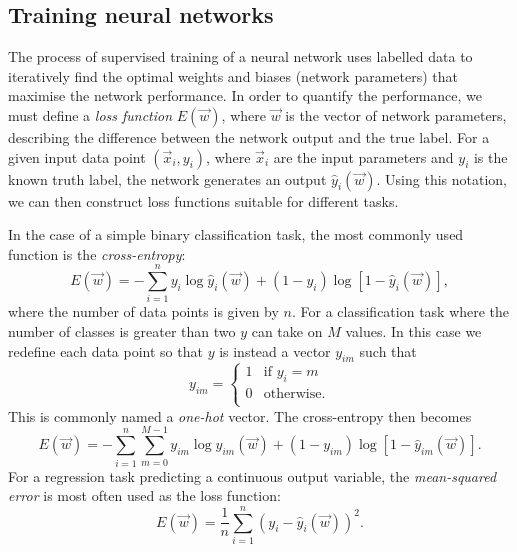 \subsection{Training neural networks} %
\label{sec:cvn_theory_training} %

The process of supervised training of a neural network uses labelled data to iteratively find the
optimal weights and biases (network parameters) that maximise the network performance. In order to
quantify the performance, we must define a \emph{loss function} $E(\vec{w})$, where $\vec{w}$ is
the vector of network parameters, describing the difference between the network output and the
true label. For a given input data point $(\vec{x}_{i}, y_{i})$, where $\vec{x}_{i}$ are the input
parameters and $y_{i}$ is the known truth label, the network generates an output
$\hat{y}_{i}(\vec{w})$. Using this notation, we can then construct loss functions suitable for
different tasks.

In the case of a simple binary classification task, the most commonly used function is the
\emph{cross-entropy}:
\begin{equation} %
    E(\vec{w})=
    -\displaystyle\sum_{i=1}^{n}y_{i}\log\hat{y}_{i}(\vec{w})+
    (1-y_{i})\log[1-\hat{y}_{i}(\vec{w})],
    \label{eq:binary_cross_entropy}
\end{equation}
where the number of data points is given by $n$. For a classification task where the number of
classes is greater than two $y$ can take on $M$ values. In this case we redefine each data point
so that $y$ is instead a vector $y_{im}$ such that
\begin{equation} %
    y_{im}=
    \begin{cases}
        1 & \text{if $y_{i}=m$} \\
        0 & \text{otherwise.}   \\
    \end{cases}
\end{equation}
This is commonly named a \emph{one-hot} vector. The cross-entropy then becomes
\begin{equation} %
    E(\vec{w})=
    -\displaystyle\sum_{i=1}^{n}\displaystyle\sum_{m=0}^{M-1}y_{im}\log\hat{y}_{im}
    (\vec{w})+(1-y_{im})\log[1-\hat{y}_{im}(\vec{w})].
    \label{eq:categorical_cross_entropy}
\end{equation}
For a regression task predicting a continuous output variable, the \emph{mean-squared error} is
most often used as the loss function:
\begin{equation} %
    E(\vec{w})=
    \frac{1}{n}\displaystyle\sum_{i=1}^{n}(y_{i}-
    \hat{y}_{i}(\vec{w}))^{2}.
    \label{eq:mse}
\end{equation}

